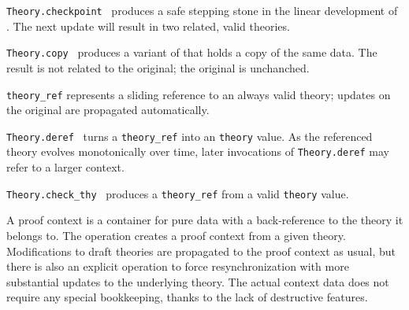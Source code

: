 \begin{isabellebody}
\begin{isamarkuptext}
\begin{description}
  \item \verb|Theory.checkpoint|~ produces a safe
  stepping stone in the linear development of .  The next
  update will result in two related, valid theories.

  \item \verb|Theory.copy|~ produces a variant of  that holds a copy of the same data.  The result is not
  related to the original; the original is unchanched.

  \item \verb|theory_ref| represents a sliding reference to an
  always valid theory; updates on the original are propagated
  automatically.

  \item \verb|Theory.deref|~ turns a \verb|theory_ref| into an \verb|theory| value.  As the referenced
  theory evolves monotonically over time, later invocations of \verb|Theory.deref| may refer to a larger context.

  \item \verb|Theory.check_thy|~ produces a \verb|theory_ref| from a valid \verb|theory| value.

  \end{description}%
\end{isamarkuptext}%
\isamarkuptrue%
%
\endisatagmlref
{\isafoldmlref}%
%
\isadelimmlref
%
\endisadelimmlref
%
\isamarkuptrue%
%
\begin{isamarkuptext}%

  A proof context is a container for pure data with a back-reference
  to the theory it belongs to.  The  operation creates a
  proof context from a given theory.  Modifications to draft theories
  are propagated to the proof context as usual, but there is also an
  explicit  operation to force resynchronization
  with more substantial updates to the underlying theory.  The actual
  context data does not require any special bookkeeping, thanks to the
  lack of destructive features.


\end{isamarkuptext}
\end{isabellebody}
